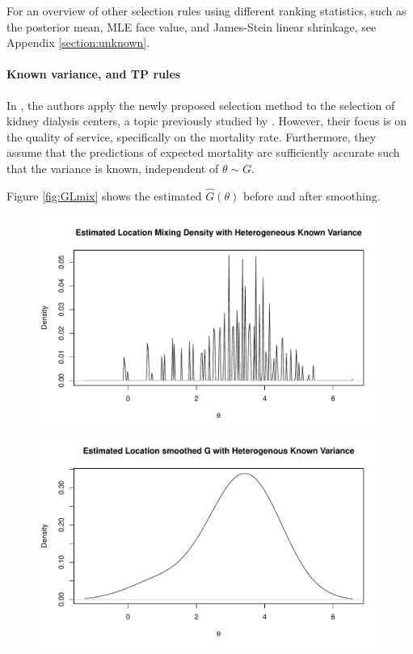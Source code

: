 \documentclass[12pt]{article}
\begin{document}
For an overview of other selection rules using different ranking statistics,
such as the posterior mean, MLE face value, and James-Stein linear shrinkage,
see Appendix \ref{section:unknown}.

\paragraph{Known variance, and TP rules}

In \citet{gu2023invidious}, the authors apply the newly proposed selection
method to the selection of kidney dialysis centers, a topic previously studied
by \citet{lin2006loss, lin2009ranking}. However, their focus is on the quality
of service, specifically on the mortality rate. Furthermore, they assume that
the predictions of expected mortality are sufficiently accurate such that the
variance is known, independent of $\theta \sim G$.

Figure \ref{fig:GLmix} shows the estimated $\hat{G}(\theta)$ before and after
smoothing.

\begin{figure}[h!]
    \centering
    \begin{minipage}{0.5\textwidth}
        \centering
        \includegraphics[width=\textwidth]{../../Figures/2013-2022/GMM_fd/GLmix.pdf}
    \end{minipage}\hfill
    \begin{minipage}{0.5\textwidth}
        \centering
        \includegraphics[width=\textwidth]{../../Figures/2013-2022/GMM_fd/GLmix_s.pdf}
    \end{minipage}
\end{figure}
\end{document}
